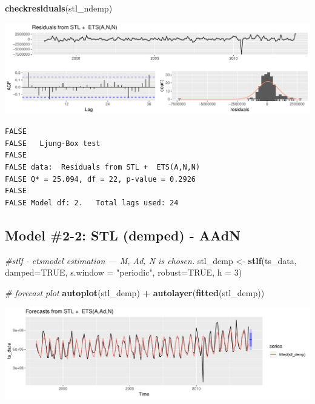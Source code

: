 \documentclass[openany]{book}
\newenvironment{Shaded}{\begin{snugshade}}{\end{snugshade}}
\newcommand{\CommentTok}[1]{\textcolor[rgb]{0.56,0.35,0.01}{\textit{#1}}}
\newcommand{\DataTypeTok}[1]{\textcolor[rgb]{0.13,0.29,0.53}{#1}}
\newcommand{\DecValTok}[1]{\textcolor[rgb]{0.00,0.00,0.81}{#1}}
\newcommand{\KeywordTok}[1]{\textcolor[rgb]{0.13,0.29,0.53}{\textbf{#1}}}
\newcommand{\NormalTok}[1]{#1}
\newcommand{\OperatorTok}[1]{\textcolor[rgb]{0.81,0.36,0.00}{\textbf{#1}}}
\newcommand{\OtherTok}[1]{\textcolor[rgb]{0.56,0.35,0.01}{#1}}
\newcommand{\StringTok}[1]{\textcolor[rgb]{0.31,0.60,0.02}{#1}}
\begin{document}
\begin{Shaded}
\begin{Highlighting}[]
\KeywordTok{checkresiduals}\NormalTok{(stl_ndemp)}
\end{Highlighting}
\end{Shaded}

\includegraphics{Part-B-AS_files/figure-latex/unnamed-chunk-5-2.pdf}

\begin{verbatim}
FALSE 
FALSE   Ljung-Box test
FALSE 
FALSE data:  Residuals from STL +  ETS(A,N,N)
FALSE Q* = 25.094, df = 22, p-value = 0.2926
FALSE 
FALSE Model df: 2.   Total lags used: 24
\end{verbatim}

\hypertarget{model-2-2-stl-demped---aadn}{%
\subsection{Model \#2-2: STL (demped) -
AAdN}\label{model-2-2-stl-demped---aadn}}

\begin{Shaded}
\begin{Highlighting}[]
\CommentTok{#stlf - etsmodel estimation --- M, Ad, N is chosen.}
\NormalTok{stl_demp <-}\StringTok{ }\KeywordTok{stlf}\NormalTok{(ts_data, }\DataTypeTok{damped=}\OtherTok{TRUE}\NormalTok{, }\DataTypeTok{s.window =} \StringTok{"periodic"}\NormalTok{, }\DataTypeTok{robust=}\OtherTok{TRUE}\NormalTok{, }\DataTypeTok{h =} \DecValTok{3}\NormalTok{)}

\CommentTok{# forecast plot}
\KeywordTok{autoplot}\NormalTok{(stl_demp) }\OperatorTok{+}\StringTok{ }\KeywordTok{autolayer}\NormalTok{(}\KeywordTok{fitted}\NormalTok{(stl_demp))}
\end{Highlighting}
\end{Shaded}

\includegraphics{Part-B-AS_files/figure-latex/unnamed-chunk-6-1.pdf}
\end{document}
